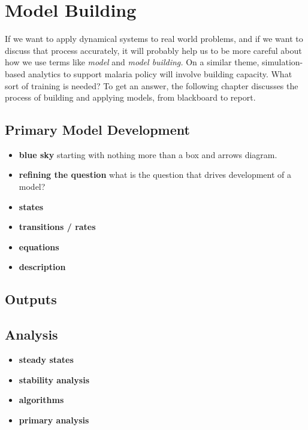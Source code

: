 \documentclass[
]{book}
\begin{document}
\hypertarget{model-building}{%
\chapter{Model Building}\label{model-building}}

If we want to apply dynamical systems to real world problems, and if we want to discuss that process accurately, it will probably help us to be more careful about how we use terms like \emph{model} and \emph{model building.} On a similar theme, simulation-based analytics to support malaria policy will involve building capacity. What sort of training is needed? To get an answer, the following chapter discusses the process of building and applying models, from blackboard to report.

\hypertarget{primary-model-development}{%
\section{Primary Model Development}\label{primary-model-development}}

\begin{itemize}
\item
  \textbf{blue sky} starting with nothing more than a box and arrows diagram.
\item
  \textbf{refining the question} what is the question that drives development of a model?
\item
  \textbf{states}
\item
  \textbf{transitions / rates}
\item
  \textbf{equations}
\item
  \textbf{description}
\end{itemize}

\hypertarget{outputs}{%
\section{Outputs}\label{outputs}}

\hypertarget{analysis}{%
\section{Analysis}\label{analysis}}

\begin{itemize}
\item
  \textbf{steady states}
\item
  \textbf{stability analysis}
\item
  \textbf{algorithms}
\item
  \textbf{primary analysis}
\end{itemize}
\end{document}
